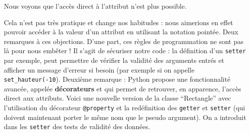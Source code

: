 \documentclass[
  letterpaper,
  DIV=11,
  numbers=noendperiod]{scrartcl}
\begin{document}
Nous voyons que l'accès direct à l'attribut n'est plus possible.

Cela n'est pas très pratique et change nos habitudes : nous aimerions en
effet pouvoir accéder à la valeur d'un attribut en utilisant la notation
pointée. Deux remarques à ces objections. D'une part, ces règles de
programmation ne sont pas là pour nous embêter ! Il s'agit de sécuriser
notre code : la définition d'un \texttt{setter} par exemple, peut
permettre de vérifier la validité des arguments entrés et afficher un
message d'erreur si besoin (par exemple si on appelle
\texttt{set\_hauteur(-10}). Deuxième remarque : Python propose une
fonctionnalité avancée, appelée \textbf{décorateurs} et qui permet de
retrouver, en apparence, l'accès direct aux attributs. Voici une
nouvelle version de la classe ``Rectangle'' avec l'utilisation du
décorateur \texttt{@property} et la redéfinition des \texttt{getter} et
\texttt{setter} (qui doivent maintenant porter le même nom que le pseudo
argument). On a introduit dans les \texttt{setter} des tests de validité
des données.
\end{document}
